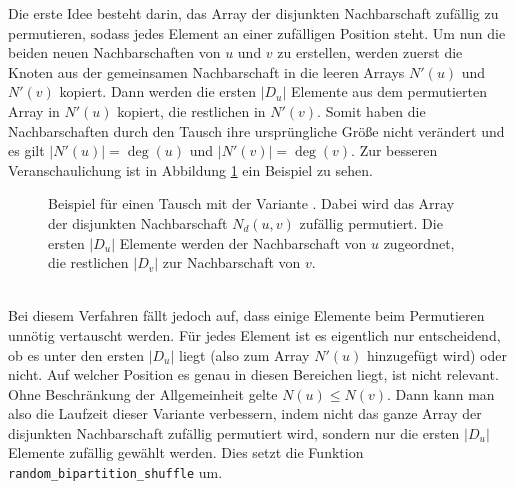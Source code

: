 Die erste Idee besteht darin,  
das Array der disjunkten Nachbarschaft zufällig zu permutieren, sodass jedes Element an 
einer zufälligen Position steht. Um nun die beiden \glqq neuen\grqq{} Nachbarschaften von $u$ und $v$ zu erstellen,
werden zuerst die Knoten aus der gemeinsamen Nachbarschaft in die leeren Arrays $N'(u)$ und $N'(v)$ kopiert.
Dann werden die ersten $|D_{u}|$ Elemente aus dem permutierten Array in $N'(u)$ kopiert, die restlichen
in $N'(v)$. Somit haben die Nachbarschaften durch den Tausch ihre 
ursprüngliche Größe nicht verändert und es gilt $|N'(u)| = \deg(u)$ und
$|N'(v)| = \deg(v)$.
Zur besseren Veranschaulichung ist in Abbildung \ref{fig:trade_shuffle} ein Beispiel zu sehen.
\begin{figure}
\centering
  \caption[Beispiel eines Tausches der disjunkten Nachbarschaft mit der Variante \perm]{Beispiel für einen Tausch mit der Variante \perm. Dabei wird das Array der 
  disjunkten Nachbarschaft $N_{d}(u,v)$ zufällig permutiert. Die ersten $|D_{u}|$ Elemente werden der Nachbarschaft
  von $u$ zugeordnet, die restlichen $|D_{v}|$ zur Nachbarschaft von $v$. }
  \label{fig:trade_shuffle}
\end{figure}
\\

Bei diesem Verfahren fällt  jedoch auf, dass einige Elemente beim Permutieren unnötig vertauscht werden.
Für jedes Element ist es eigentlich nur entscheidend, ob es unter den ersten $|D_{u}|$  liegt (also zum Array
$N'(u)$ hinzugefügt wird) oder nicht. Auf welcher Position es genau in 
diesen Bereichen liegt, ist nicht relevant. Ohne Beschränkung der Allgemeinheit gelte 
$N(u) \le N(v)$. Dann kann man
also die Laufzeit dieser Variante verbessern, indem nicht das ganze Array der disjunkten Nachbarschaft zufällig permutiert 
wird, sondern nur die ersten $|D_{u}|$ Elemente zufällig gewählt werden.
 Dies setzt die Funktion 
\texttt{random\_bipartition\_shuffle} um.
\\


